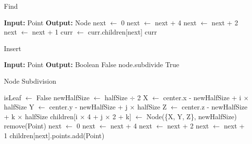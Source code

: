 \documentclass[a4paper]{article}
\begin{document}
\setcounter{algorithm}{0}
\begin{algorithm}
    \caption{Find}\label{alg:octree find}
    \begin{algorithmic}[1]
        \Statex \textbf{Input:} Point
        \Statex \textbf{Output:} Node
        \State next $\leftarrow$ 0
        \State next $\leftarrow$ next + 4
        \EndIf
        \State next $\leftarrow$ next + 2
        \EndIf
        \State next $\leftarrow$ next + 1
        \EndIf
        \State curr $\leftarrow$ curr.children[next]
        \EndWhile
        \State \Return curr
    \end{algorithmic}
\end{algorithm}


\begin{algorithm}
    \caption{Insert}\label{alg:octree insert}
    \begin{algorithmic}[1]
        \Statex \textbf{Input:} Point
        \Statex \textbf{Output:} Boolean
        \State \Return False
        \EndIf
        \State node.subdivide
        \EndIf
        \State \Return True
    \end{algorithmic}
\end{algorithm}


\begin{algorithm}
    \caption{Node Subdivision}\label{alg:octree subdivide}
    \begin{algorithmic}[1]
        \State isLeaf $\leftarrow$ False
        \State newHalfSize $\leftarrow$ halfSize $\div$ 2
        \State X $\leftarrow$ center.x - newHalfSize + i $\times$ halfSize
        \State Y $\leftarrow$ center.y - newHalfSize + j $\times$ halfSize
        \State Z $\leftarrow$ center.z - newHalfSize + k $\times$ halfSize
        \State children[i $\times$ 4 + j $\times$ 2 + k] $\leftarrow$ Node(\{X, Y, Z\}, newHalfSize)
        \EndFor
        \EndFor
        \EndFor
        \State remove(Point)
        \State next $\leftarrow$ 0
        \State next $\leftarrow$ next + 4
        \EndIf
        \State next $\leftarrow$ next + 2
        \EndIf
        \State next $\leftarrow$ next + 1
        \EndIf
        \State children[next].points.add(Point)
        \EndFor
    \end{algorithmic}
\end{algorithm}
\end{document}
